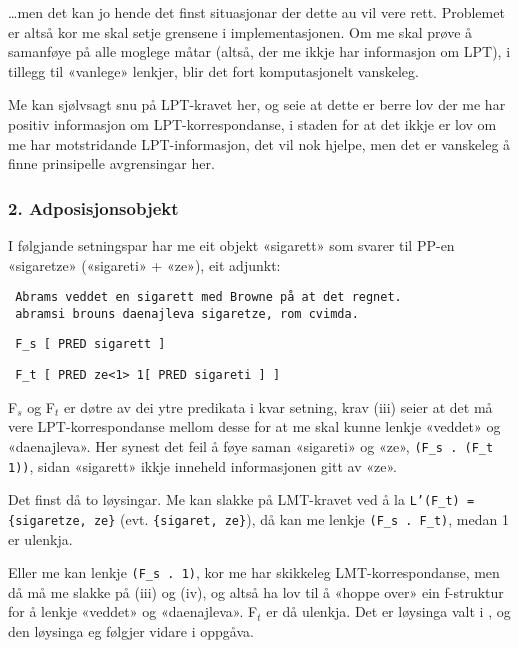 \documentclass[11pt,a4paper,oneside,draft]{book}
\begin{document}
\ldots{}men det kan jo hende det finst situasjonar der dette au vil vere
rett. Problemet er altså kor me skal setje grensene i
implementasjonen. Om me skal prøve å samanføye på alle moglege måtar
(altså, der me ikkje har informasjon om LPT), i tillegg til «vanlege»
lenkjer, blir det fort komputasjonelt vanskeleg. 

 Me kan sjølvsagt snu
på LPT-kravet her, og seie at dette er berre lov der me har positiv
informasjon om LPT-korrespondanse, i staden for at det ikkje er lov om
me har motstridande LPT-informasjon, det vil nok hjelpe, men det er
vanskeleg å finne prinsipelle avgrensingar her. 
\subsubsection{2. Adposisjonsobjekt}
\label{sec-3.6.4.2}


I følgjande setningspar har me eit objekt «sigarett» som svarer til
PP-en «sigaretze» («sigareti» + «ze»), eit adjunkt:

\begin{verbatim}
 Abrams veddet en sigarett med Browne på at det regnet.
 abramsi brouns daenajleva sigaretze, rom cvimda.
\end{verbatim}


\begin{verbatim}
 F_s [ PRED sigarett ]
\end{verbatim}


\begin{verbatim}
 F_t [ PRED ze<1> 1[ PRED sigareti ] ]
\end{verbatim}


F$_s$ og F$_t$ er døtre av dei ytre predikata i kvar setning, krav (iii)
seier at det må vere LPT-korrespondanse mellom desse for at me skal
kunne lenkje «veddet» og «daenajleva».  Her synest det feil å føye
saman «sigareti» og «ze», \texttt{(F\_s . (F\_t 1))}, sidan «sigarett» ikkje
inneheld informasjonen gitt av «ze».

Det finst då to løysingar. Me kan slakke på LMT-kravet ved å la
\texttt{L'(F\_t) = \{sigaretze, ze\}} (evt. \texttt{\{sigaret, ze\}}), då kan me lenkje
\texttt{(F\_s . F\_t)}, medan 1 er ulenkja.

Eller me kan lenkje \texttt{(F\_s . 1)}, kor me har skikkeleg
LMT-korrespondanse, men då må me slakke på (iii) og (iv), og altså ha
lov til å «hoppe over» ein f-struktur for å lenkje «veddet» og
«daenajleva». F$_t$ er då ulenkja. Det er løysinga valt i
\citet[s.~75,~fotnote~3]{dyvik2009lmp}, og den løysinga eg følgjer
vidare i oppgåva.
\end{document}
